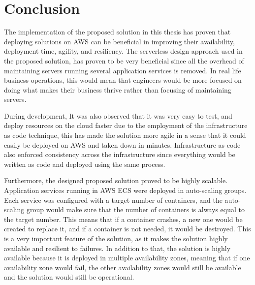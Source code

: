 
\chapter{Conclusion}
\label{chap:conclusion}



The implementation of the proposed solution in this thesis has proven that deploying solutions on AWS can be beneficial in improving their availability, deployment time, agility, and resiliency. The serverless design approach used in the proposed solution, has proven to be very beneficial since all the overhead of maintaining servers running several application services is removed. In real life business operations, this would mean that engineers would be more focused on doing what makes their business thrive rather than focusing of maintaining servers.

During development, It was also observed that it was very easy to test, and deploy resources on the cloud faster due to the employment of the infrastructure as code technique, this has made the solution more agile in a sense that it could easily be deployed on AWS and taken down in minutes. Infrastructure as code also enforced consistency across the infrastructure since everything would be written as code and deployed using the same process.

Furthermore, the designed proposed solution proved to be highly scalable. Application services running in AWS ECS were deployed in auto-scaling groups. Each service was configured with a target number of containers, and the auto-scaling group would make sure that the number of containers is always equal to the target number. This means that if a container crashes, a new one would be created to replace it, and if a container is not needed, it would be destroyed. This is a very important feature of the solution, as it makes the solution highly available and resilient to failures. In addition to that, the solution is highly available because it is deployed in multiple availability zones, meaning that if one availability zone would fail, the other availability zones would still be available and the solution would still be operational.

